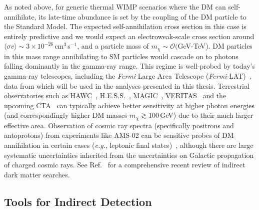 As noted above, for generic thermal WIMP scenarios where the DM can self-annihilate, its late-time abundance is set by the coupling of the DM particle to the Standard Model. The expected self-annihilation cross section in this case is entirely predictive and we would expect an electroweak-scale cross section around $\langle\sigma v\rangle\sim 3\times10^{-26}$\,cm$^3$\,s$^{-1}$, and a particle mass of $m_\chi\sim\mathcal O($GeV-TeV). DM particles in this mass range annihilating to SM particles would cascade on to photons falling dominantly in the gamma-ray range. This regime is well-probed by today's gamma-ray telescopes, including the \emph{Fermi} Large Area Telescope (\emph{Fermi}-LAT)~\cite{Atwood:2009ez}, data from which will be used in the analyses presented in this thesis. Terrestrial observatories such as HAWC~\cite{Abeysekara:2014ffg}, H.E.S.S.~\cite{Abdallah:2018qtu}, MAGIC~\cite{Ahnen:2017pqx}, VERITAS~\cite{Archambault:2017wyh} and the upcoming CTA~\cite{Doro:2012xx} can typically achieve better sensitivity at higher photon energies (and correspondingly higher DM masses $m_\chi\gtrsim 100$\,GeV) due to their much larger effective area. Observation of cosmic ray spectra (specifically positrons and antoprotons) from experiments like AMS-02 can be sensitive probes of DM annihilation in certain cases (\emph{e.g.}, leptonic final states)~\cite{Aguilar:2014mma,Bergstrom:2013jra}, although there are large systematic uncertainties inherited from the uncertainties on Galactic propagation of charged cosmic rays. See Ref.~\cite{Slatyer:2017sev} for a comprehensive recent review of indirect dark matter searches.   %

\subsection{Tools for Indirect Detection}

